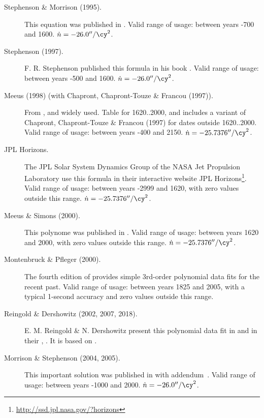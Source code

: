 \begin{description}
\item[Stephenson \& Morrison (1995).] This equation was published in . 
  Valid range of usage: between years -700 and 1600. $\dot{n}=-26.0''/\cy^2$.

\item[Stephenson (1997).] F. R. Stephenson published this formula in
  his book . Valid range of usage: between
  years -500 and 1600. $\dot{n}=-26.0''/\cy^2$.

\item[Meeus (1998) (with Chapront, Chapront-Touze \& Francou (1997)).]
  From , and widely
  used. Table for 1620..2000, and includes a variant of Chapront,
  Chapront-Touze \& Francou (1997) for dates outside 1620..2000. 
  Valid range of usage: between years -400 and 2150. $\dot{n}=-25.7376''/\cy^2$.

\item[JPL Horizons.] The JPL Solar System Dynamics Group of the NASA
  Jet Propulsion Laboratory use this formula in their interactive
  website JPL
  Horizons\footnote{\url{http://ssd.jpl.nasa.gov/?horizons}}. Valid
  range of usage: between years -2999 and 1620, with zero values
  outside this range. $\dot{n}=-25.7376''/\cy^2$.

\item[Meeus \& Simons (2000).] This polynome was published in . 
  Valid range of usage: between years 1620 and 2000, with zero values outside this
  range. $\dot{n}=-25.7376''/\cy^2$.

\item[Montenbruck \& Pfleger (2000).] The fourth edition of
   provides simple 3rd-order
  polynomial data fits for the recent past. Valid range of usage:
  between years 1825 and 2005, with a typical 1-second accuracy and
  zero values outside this range.

\item[Reingold \& Dershowitz (2002, 2007, 2018).] E. M. Reingold \&
  N. Dershowitz present this polynomial data fit in  and in their
  , . It is
  based on .

\item[Morrison \& Stephenson (2004, 2005).] This important solution
  was published in %
   with
  addendum~\citep{2005JHA....36..339M}. Valid range of usage: between
  years -1000 and 2000. $\dot{n}=-26.0''/\cy^2$.


\end{description}
